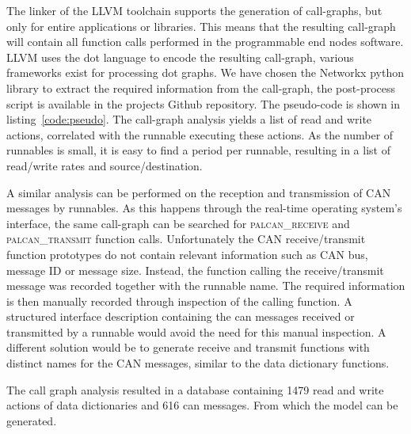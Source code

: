 The linker of the LLVM toolchain supports the generation of call-graphs, but only for entire applications or libraries. This means that the resulting call-graph will contain all function calls performed in the programmable end nodes software. LLVM uses the dot language to encode the resulting call-graph, various frameworks exist for processing dot graphs. We have chosen the Networkx python library to extract the required information from the call-graph, the post-process script is available in the projects Github repository. The pseudo-code is shown in listing~\ref{code:pseudo}. The call-graph analysis yields a list of read and write actions, correlated with the runnable executing these actions. As the number of runnables is small, it is easy to find a period per runnable, resulting in a list of read/write rates and source/destination. 

A similar analysis can be performed on the reception and transmission of CAN messages by runnables. As this happens through the real-time operating system's interface, the same call-graph can be searched for \textsc{palcan\_receive} and \textsc{palcan\_transmit} function calls. Unfortunately the CAN receive/transmit function prototypes do not contain relevant information such as CAN bus, message ID or message size. Instead, the function calling the receive/transmit message was recorded together with the runnable name. The required information is then manually recorded through inspection of the calling function. A structured interface description containing the can messages received or transmitted by a runnable would avoid the need for this manual inspection. A different solution would be to generate receive and transmit functions with distinct names for the CAN messages, similar to the data dictionary functions.

The call graph analysis resulted in a database containing 1479 read and write actions of data dictionaries and 616 can messages. From which the \omnet model can be generated.


